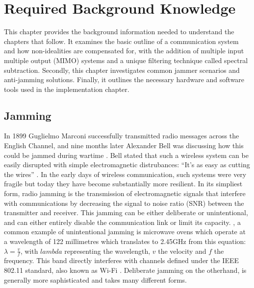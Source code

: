 \chapter{Required Background Knowledge}
\label{ch:background}

This chapter provides the background information needed to understand the chapters that follow.  It examines the basic outline of a communication system and how non-idealities are compensated for, with the addition of multiple input multiple output (MIMO) systems and a unique filtering technique called spectral subtraction.   Secondly, this chapter investigates common jammer scenarios and anti-jamming solutions.  Finally, it outlines the necessary hardware and software tools used in the implementation chapter.

\section{Jamming}

In 1899 Guglielmo Marconi successfully transmitted radio messages across the English Channel, and nine months later Alexander Bell was discussing how this could be jammed during wartime \cite{10}. Bell stated that such a wireless system can be easily disrupted with simple electromagnetic distrubances:  ``It's as easy as cutting the wires'' \cite{10}.  In the early days of wireless communication, such systems were very fragile but today they have become substantially more resilient. In its simpliest form, radio jamming is the transmission of electromagnetic signals that interfere with communications by decreasing the signal to noise ratio (SNR) between the transmitter and receiver.  This jamming can be either deliberate or unintentional, and can either entirely disable the communication link or limit its capacity.  , a common example of unintentional jamming is microwave ovens which operate at a wavelength of 122 millimetres which translates to 2.45GHz from this equation: \(\lambda=\frac{v}{f}\), with \(lambda\) representing the wavelength, \(v\) the velocity and \(f\) the frequency. This band directly interferes with channels defined under the IEEE 802.11 standard, also known as Wi-Fi \cite{ieee80211}.  Deliberate jamming on the otherhand, is generally more saphisticated and takes many different forms.\\

